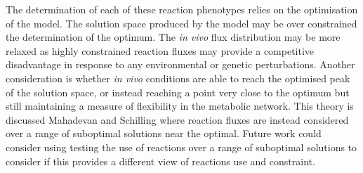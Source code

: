 The determination of each of these reaction phenotypes relies on the optimisation of the model. The solution space produced by the model may be over constrained the determination of the optimum. The \emph{in vivo} flux distribution may be more relaxed as highly constrained reaction fluxes may provide a competitive disadvantage in response to any environmental or genetic perturbations. Another consideration is whether \emph{in vivo} conditions are able to reach the optimised peak of the solution space, or instead reaching a point very close to the optimum but still maintaining a measure of flexibility in the metabolic network. This theory is discussed Mahadevan and Schilling \cite{mahadevan2003} where reaction fluxes are instead considered over a range of suboptimal solutions near the optimal. Future work could consider using testing the use of reactions over a range of suboptimal solutions to consider if this provides a different view of reactions use and constraint.
